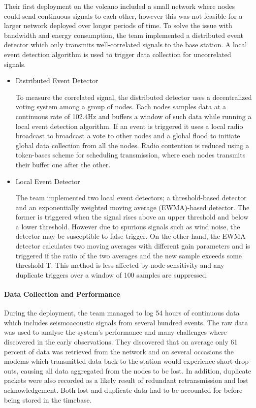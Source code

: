 Their first deployment on the volcano included a small network where nodes could send continuous signals to each other, however this was not feasible for a larger network deployed over longer periods of time. To solve the issue with bandwidth and energy consumption, the team implemented a distributed event detector which only transmits well-correlated signals to the base station. A local event detection algorithm is used to trigger data collection for uncorrelated signals.

\begin{itemize}
\item Distributed Event Detector

To measure the correlated signal, the distributed detector uses a decentralized voting system among a group of nodes. Each nodes samples data at a continuous rate of 102.4Hz and buffers a window of such data while running a local event detection algorithm. If an event is triggered it uses a local radio broadcast to broadcast a vote to other nodes and a global flood to initiate global data collection from all the nodes. Radio contention is reduced using a token-bases scheme for scheduling transmission, where each nodes transmits their buffer one after the other. 

\item Local Event Detector

The team implemented two local event detectors; a threshold-based detector and an exponentially weighted moving average (EWMA)-based detector. The former is triggered when the signal rises above an upper threshold and below a lower threshold. However due to spurious signals such as wind noise, the detector may be susceptible to false trigger. On the other hand, the EWMA detector calculates two moving averages with different gain parameters and is triggered if the ratio of the two averages and the new sample exceeds some threshold T. This method is less affected by node sensitivity and any duplicate triggers over a window of 100 samples are suppressed.
\end{itemize}

\paragraph{Data Collection and Performance}

During the deployment, the team managed to log 54 hours of continuous data which includes seismoacoustic signals from several hundred events. The raw data was used to analyse the system's performance and many challenges where discovered in the early observations. They discovered that on average only 61 percent of data was retrieved from the network and on several occasions the modems which transmitted data back to the station would experience short drop-outs, causing all data aggregated from the nodes to be lost. In addition, duplicate packets were also recorded as a likely result of redundant retransmission and lost acknowledgement. Both lost and duplicate data had to be accounted for before being stored in the timebase.


